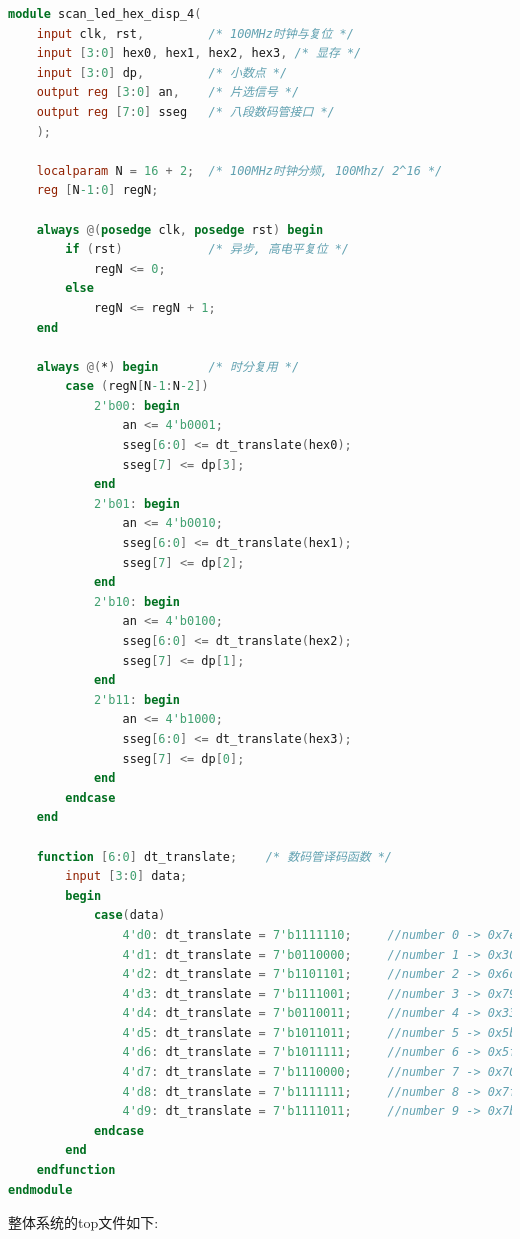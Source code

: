 \documentclass{article}
\begin{document}
\begin{lstlisting}[language=Verilog, caption={数码管扫描显示}]
module scan_led_hex_disp_4(
    input clk, rst,         /* 100MHz时钟与复位 */
    input [3:0] hex0, hex1, hex2, hex3, /* 显存 */
    input [3:0] dp,         /* 小数点 */
    output reg [3:0] an,    /* 片选信号 */
    output reg [7:0] sseg   /* 八段数码管接口 */
    );

    localparam N = 16 + 2;  /* 100MHz时钟分频, 100Mhz/ 2^16 */         
    reg [N-1:0] regN;

    always @(posedge clk, posedge rst) begin
        if (rst)            /* 异步, 高电平复位 */
            regN <= 0;
        else 
            regN <= regN + 1;
    end

    always @(*) begin       /* 时分复用 */
        case (regN[N-1:N-2])
            2'b00: begin
                an <= 4'b0001;
                sseg[6:0] <= dt_translate(hex0);
                sseg[7] <= dp[3];
            end
            2'b01: begin
                an <= 4'b0010;
                sseg[6:0] <= dt_translate(hex1);
                sseg[7] <= dp[2];
            end
            2'b10: begin
                an <= 4'b0100;
                sseg[6:0] <= dt_translate(hex2);
                sseg[7] <= dp[1];
            end
            2'b11: begin
                an <= 4'b1000;
                sseg[6:0] <= dt_translate(hex3);
                sseg[7] <= dp[0];
            end 
        endcase
    end

    function [6:0] dt_translate;    /* 数码管译码函数 */
        input [3:0] data;
        begin
            case(data)
                4'd0: dt_translate = 7'b1111110;     //number 0 -> 0x7e
                4'd1: dt_translate = 7'b0110000;     //number 1 -> 0x30
                4'd2: dt_translate = 7'b1101101;     //number 2 -> 0x6d
                4'd3: dt_translate = 7'b1111001;     //number 3 -> 0x79
                4'd4: dt_translate = 7'b0110011;     //number 4 -> 0x33
                4'd5: dt_translate = 7'b1011011;     //number 5 -> 0x5b
                4'd6: dt_translate = 7'b1011111;     //number 6 -> 0x5f
                4'd7: dt_translate = 7'b1110000;     //number 7 -> 0x70
                4'd8: dt_translate = 7'b1111111;     //number 8 -> 0x7f
                4'd9: dt_translate = 7'b1111011;     //number 9 -> 0x7b
            endcase
        end
    endfunction
endmodule
\end{lstlisting}
整体系统的top文件如下:
\end{document}
